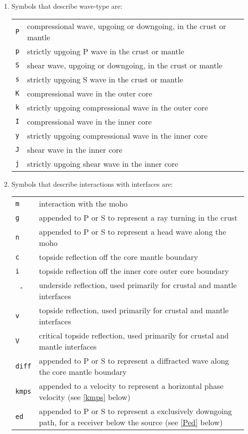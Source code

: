 \begin{enumerate}
\item Symbols that describe wave-type are:

\begin{tabular}{lp{5.0in}}
\texttt{P} & compressional wave, upgoing or downgoing, in the crust or mantle \\
\texttt{p} & strictly upgoing P wave in the crust or mantle \\
\texttt{S} & shear wave, upgoing or downgoing, in the crust or mantle \\
\texttt{s} & strictly upgoing S wave in the crust or mantle \\
\texttt{K} & compressional wave in the outer core \\
\texttt{k} & strictly upgoing compressional wave in the outer core \\
\texttt{I} & compressional wave in the inner core \\
\texttt{y} & strictly upgoing compressional wave in the inner core \\
\texttt{J} & shear wave in the inner core \\
\texttt{j} & strictly upgoing shear wave in the inner core \\
\end{tabular}

\item Symbols that describe interactions with interfaces are:

\begin{tabular}{lp{5.0in}}
\texttt{m} & interaction with the moho \\
\texttt{g} & appended to P or S to represent a ray turning in the crust \\
\texttt{n} & appended to P or S to represent a head wave along the moho \\
\texttt{c} & topside reflection off the core mantle boundary \\
\texttt{i} & topside reflection off the inner core outer core boundary \\
\texttt{\^\,} & underside reflection, used primarily for crustal and mantle interfaces \\
\texttt{v} & topside reflection, used primarily for crustal and mantle interfaces \\
\texttt{V} & critical topside reflection, used primarily for crustal and mantle interfaces \\
\texttt{diff} & appended to P or S to represent a diffracted wave along the core mantle boundary \\
\texttt{kmps} & appended to a velocity to represent a horizontal phase velocity (see
\ref{kmps} below)\\
\texttt{ed} & appended to P or S to represent a exclusively downgoing path, for a receiver below the source (see
\ref{Ped} below)\\
\end{tabular}


\end{enumerate}
